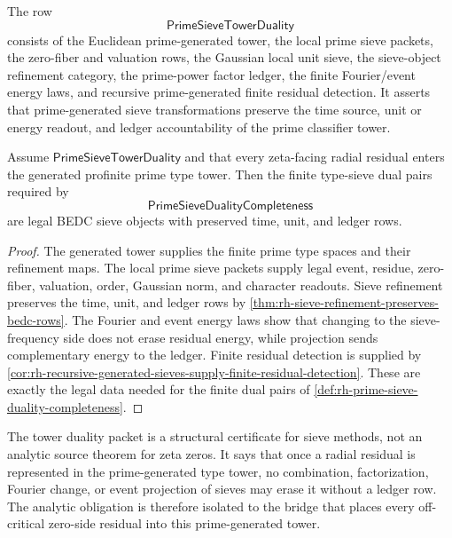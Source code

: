 \begin{definition}[PrimeSieveTowerDuality]
\label{def:rh-prime-sieve-tower-duality}
The row
$$
\mathsf{PrimeSieveTowerDuality}
$$
consists of the Euclidean prime-generated tower, the local prime sieve
packets, the zero-fiber and valuation rows, the Gaussian local unit
sieve, the sieve-object refinement category, the prime-power factor
ledger, the finite Fourier/event energy laws, and recursive
prime-generated finite residual detection.  It asserts that
prime-generated sieve transformations preserve the time source, unit or
energy readout, and ledger accountability of the prime classifier tower.
\end{definition}

\begin{theorem}
\label{thm:rh-prime-sieve-tower-duality-supplies-completeness-data}
Assume $\mathsf{PrimeSieveTowerDuality}$ and that every zeta-facing
radial residual enters the generated profinite prime type tower.  Then
the finite type-sieve dual pairs required by
$$
\mathsf{PrimeSieveDualityCompleteness}
$$
are legal BEDC sieve objects with preserved time, unit, and ledger
rows.
\end{theorem}

\begin{proof}
The generated tower supplies the finite prime type spaces and their
refinement maps.  The local prime sieve packets supply legal event,
residue, zero-fiber, valuation, order, Gaussian norm, and character
readouts.  Sieve refinement preserves the time, unit, and ledger rows by
\autoref{thm:rh-sieve-refinement-preserves-bedc-rows}.  The Fourier and
event energy laws show that changing to the sieve-frequency side does
not erase residual energy, while projection sends complementary energy
to the ledger.  Finite residual detection is supplied by
\autoref{cor:rh-recursive-generated-sieves-supply-finite-residual-detection}.
These are exactly the legal data needed for the finite dual pairs of
\autoref{def:rh-prime-sieve-duality-completeness}.
\end{proof}

\begin{principle}
\label{prin:rh-prime-sieve-tower-audit-boundary}
The tower duality packet is a structural certificate for sieve methods,
not an analytic source theorem for zeta zeros.  It says that once a
radial residual is represented in the prime-generated type tower, no
combination, factorization, Fourier change, or event projection of
sieves may erase it without a ledger row.  The analytic obligation is
therefore isolated to the bridge that places every off-critical
zero-side residual into this prime-generated tower.
\end{principle}
